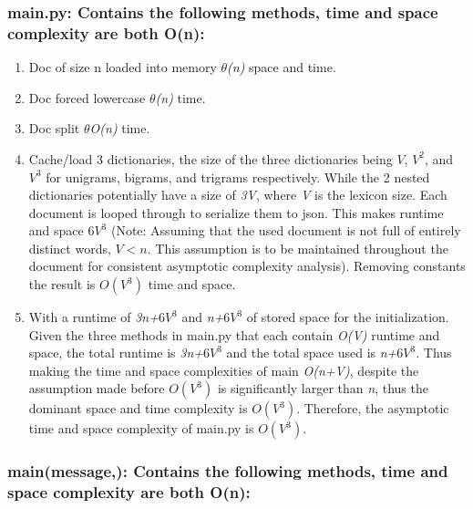 \documentclass[10pt,titlepage]{article}
\begin{document}
	\subsubsection*{\textbf{main.py: Contains the following methods, time and space complexity are both O(n)}:}
	\begin{enumerate}
		\item Doc of size n loaded into memory \textit{$\theta$(n)} space and time.
		\item Doc forced lowercase \textit{$\theta$(n)} time.
		\item Doc split \textit{$\theta$O(n)} time.
		\item Cache/load 3 dictionaries, the size of the three dictionaries being $V$, $V^2$, and $V^3$ for unigrams, bigrams, and trigrams respectively. While the 2 nested dictionaries potentially have a size of \textit{3V}, where \textit{V} is the lexicon size. Each document is looped through to serialize them to json. This makes runtime and space $6V^3$ (Note: Assuming that the used document is not full of entirely distinct words, $V < n$. This assumption is to be maintained throughout the document for consistent asymptotic complexity analysis). Removing constants the result is $O(V^3)$ time and space.
		\item With a runtime of \textit{3n+$6V^3$} and \textit{n+$6V^3$} of stored space for the initialization. Given the three methods in main.py that each contain \textit{O(V)} runtime and space, the total runtime is \textit{3n+$6V^3$} and the total space used is \textit{n+$6V^3$}. Thus making the time and space complexities of main \textit{O(n+V)}, despite the assumption made before \textit{$O(V^3)$} is significantly larger than \textit{n}, thus the dominant space and time complexity is $O(V^3)$. Therefore, the asymptotic time and space complexity of main.py is $O(V^3)$.
	\end{enumerate}
	
 	\subsubsection*{\textbf{main(message,): Contains the following methods, time and space complexity are both O(n)}:}
 	
\end{document}
